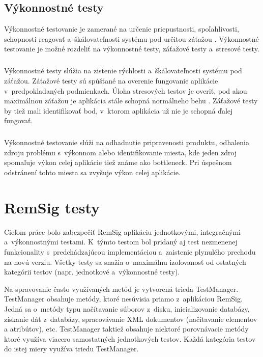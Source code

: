 \documentclass[
  printed, %
  table,   %
oneside,
  nolof,     %
  nolot,     %
]{fithesis3}
\begin{document}
\section{Výkonnostné testy}
Výkonnostné testovanie je zamerané na určenie priepustnosti, spoľahlivosti, schopnosti reagovať a~škálovateľnosti systému pod určitou záťažou \cite{ssl3.0}\cite{perfromanceTest}. Výkonnostné testovanie je možné rozdeliť na výkonnostné testy, záťažové testy a~stresové testy.\paragraph{}
Výkonnostné testy slúžia na zistenie rýchlosti a~škálovateľnosti systému pod záťažou. Záťažové testy sú spúšťané na overenie fungovanie aplikácie v~predpokladaných podmienkach. Úloha stresových  testov je overiť, pod akou maximálnou záťažou je aplikácia stále schopná normálneho behu \cite{effectiveSoftwareTesting}. Záťažové testy by tiež mali identifikovať bod, v~ktorom aplikácia už nie je schopná ďalej fungovať.\paragraph{}
Výkonnostné testovanie slúži na odhadnutie pripravenosti produktu, odhalenia zdroju problému s~výkonnom alebo  identifikovanie miesta, kde jeden zdroj spomaľuje výkon celej aplikácie tiež známe ako bottleneck. Pri úspešnom odstránení tohto miesta sa zvyšuje výkon celej aplikácie.
\chapter{RemSig testy}
Cieľom práce bolo zabezpečiť  RemSig aplikáciu jednotkovými, integračnými a~výkonnostnými testami. K~týmto testom bol pridaný aj test nezmenenej funkcionality s~predchádzajúcou implementáciou a~zaistenie plynulého prechodu na novú verziu. Všetky  testy sa snažia o~maximálnu izolovanosť od ostatných kategórii  testov (napr. jednotkové a~výkonnostné testy).

Na spravovanie často využívaných metód je vytvorená trieda TestManager. TestManager obsahuje metódy, ktoré nesúvisia priamo z~aplikáciou RemSig. Jedná sa o~metódy typu načítavanie súborov z~disku, inicializovanie databázy, získanie dát z~databázy, spracovávanie XML dokumentov (načítavanie elementov a atribútov), etc. TestManager taktiež obsahuje niektoré porovnávacie metódy ktoré využíva viacero samostatných jednotkových testov. Každá kategória testov do istej miery využíva triedu TestManager.
 
\end{document}
